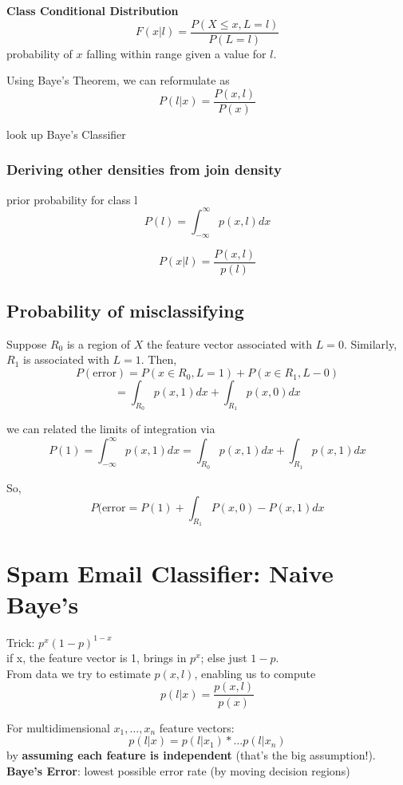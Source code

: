 \documentclass[12pt]{article}
\newcommand{\bt}[1]{\textbf{#1}} %
\begin{document}
\textbf{Class Conditional Distribution}\\
$$F(x | l) = \frac{P(X \leq x, L = l)}{P(L = l)}$$
probability of $x$ falling within range given a value for $l$.

Using Baye's Theorem, we can reformulate as
$$P(l | x) = \frac{P(x, l)}{P(x)}$$

look up Baye's Classifier

\subsubsection*{Deriving other densities from join density}
prior probability for class l
$$P(l) = \int_{-\infty}^\infty p(x, l) dx$$

$$P(x | l) = \frac{ P(x, l)}{p(l)}$$

\subsection*{Probability of misclassifying}

Suppose $R_0$ is a region of $X$ the feature vector associated with $L =0$. 
Similarly, $R_1$ is associated with $L=1$.
Then, 
$$P(\text{error}) = P(x \in R_0, L=1) + P(x \in R_1, L-0) $$
$$= \int_{R_0} p(x, 1) dx + \int_{R_1} p(x, 0) dx$$

we can related the limits of integration via 
$$P(1) = \int_{-\infty}^\infty p(x, 1) dx = \int_{R_0} p(x, 1) dx + \int_{R_1} p(x, 1) dx$$

So, 
$$P(\text{error} = P(1) + \int_{R_1} P(x, 0) - P(x, 1) dx$$




\section*{Spam Email Classifier: Naive Baye's}

Trick: $p^x ( 1 - p)^{1-x} $\\
if x, the feature vector is 1, brings in $p^x$; else just $1-p$.\\


From data we try to estimate $p(x, l)$, enabling us to compute
$$p(l | x) = \frac{p(x, l)}{p(x)}$$


For multidimensional $x_1, \dots, x_n$ feature vectors: 
$$p(l | x) = p(l | x_1) * \dots p(l | x_n)$$
by \bt{assuming each feature is independent} (that's the big assumption!).\\

\bt{Baye's Error}: lowest possible error rate (by moving decision regions)
\end{document}
